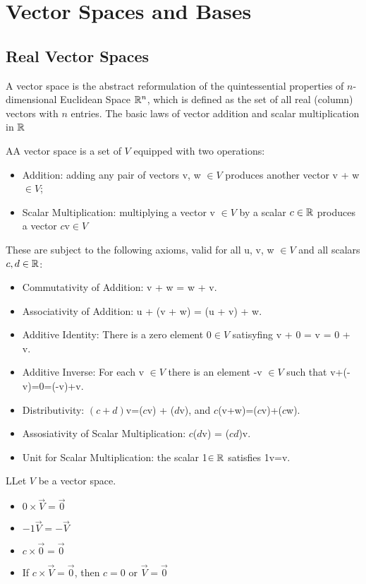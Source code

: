 \chapter{Vector Spaces and Bases}

\section{Real Vector Spaces}
  A vector space is the abstract reformulation of the quintessential properties of $n$-dimensional Euclidean Space $\mathbb{R}^n$, which is defined as the set of all real (column) vectors with $n$ entries. The basic laws of vector addition and scalar multiplication in $\mathbb{R}$

  \begin{definition}
    AA vector space is a set of $V$ equipped with two operations:
    \begin{itemize}
      \item Addition: adding any pair of vectors v, w $\in V$ produces another vector v + w $\in V$;
      \item Scalar Multiplication: multiplying a vector v $\in V$ by a scalar $c\in\mathbb{R}$ produces a vector $c$v$\in V$
    \end{itemize}

    These are subject to the following axioms, valid for all u, v, w $\in V$ and all scalars $c,d\in\mathbb{R}$:
    \begin{itemize}
      \item Commutativity of Addition: v + w = w + v.
      \item Associativity of Addition: u + (v + w) = (u + v) + w.
      \item Additive Identity: There is a zero element $0\in V$ satisyfing v + 0 = v = 0 + v.
      \item Additive Inverse: For each v $\in V$ there is an element -v $\in V$ such that v+(-v)=0=(-v)+v.
      \item Distributivity: $(c+d)$v=($c$v) + ($d$v), and $c$(v+w)=($c$v)+($c$w).
      \item Assosiativity of Scalar Multiplication: $c$($d$v) = ($cd$)v.
      \item Unit for Scalar Multiplication: the scalar 1$\in\mathbb{R}$ satisfies 1v=v.
    \end{itemize}
  \end{definition}

  \begin{theorem}
    LLet $V$ be a vector space.
    \begin{itemize}
      \item $0\times\vec{V}=\vec{0}$
      \item $-1\vec{V}=-\vec{V}$
      \item $c\times\vec{0}=\vec{0}$
      \item If $c\times\vec{V}=\vec{0}$, then $c=0$ or $\vec{V}=\vec{0}$
    \end{itemize}
  \end{theorem}
  
